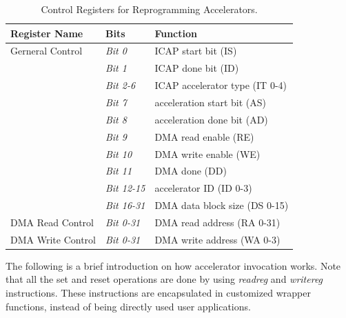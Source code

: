 \begin{table}[ht]
\scriptsize
\begin{center}
\begin{tabular}{|l|l|l|}
\hline 
\textbf{Register Name} & \textbf{Bits} & \textbf{Function}\\ 
\hline 
\hline
Gerneral Control &{\em Bit 0}   & ICAP start bit (IS)\\ 
\hline 
 &{\em Bit 1}   &  ICAP done bit (ID)\\ 
\hline 
 &{\em Bit 2-6} & ICAP accelerator type (IT 0-4)\\ 
\hline 
 &{\em Bit 7}   & acceleration start bit (AS)\\ 
\hline 
 &{\em Bit 8}   & acceleration done bit (AD)\\ 
\hline 
 &{\em Bit 9}   & DMA read enable (RE)\\ 
\hline 
 &{\em Bit 10}  & DMA write enable (WE)\\ 
\hline 
 &{\em Bit 11}  & DMA done (DD)\\
\hline
 &{\em Bit 12-15} & accelerator ID (ID 0-3)\\
\hline
 &{\em Bit 16-31} & DMA data block size (DS 0-15)\\
\hline
DMA Read Control &{\em Bit 0-31}  & DMA read address (RA 0-31)\\
\hline
DMA Write Control &{\em Bit 0-31} & DMA write address (WA 0-3)\\
\hline
\end{tabular} 
\caption{Control Registers for Reprogramming Accelerators.}
\label{tbl_AccReg}
\end{center}
\end{table}

The following is a brief introduction on how accelerator invocation
works. Note that all the set and reset operations are done by using
{\em readreg} and {\em writereg} instructions. These instructions are
encapsulated in customized wrapper functions, instead of being
directly used user applications.

